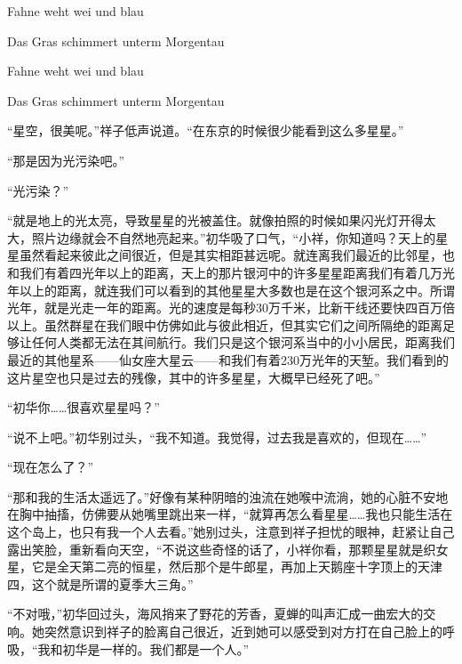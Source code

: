 \documentclass{article}
\begin{document}
Fahne weht wei und blau

Das Gras schimmert unterm Morgentau

Fahne weht wei und blau

Das Gras schimmert unterm Morgentau



“星空，很美呢。”祥子低声说道。“在东京的时候很少能看到这么多星星。”



“那是因为光污染吧。”



“光污染？”



“就是地上的光太亮，导致星星的光被盖住。就像拍照的时候如果闪光灯开得太大，照片边缘就会不自然地亮起来。”初华吸了口气，“小祥，你知道吗？天上的星星虽然看起来彼此之间很近，但是其实相距甚远呢。就连离我们最近的比邻星，也和我们有着四光年以上的距离，天上的那片银河中的许多星星距离我们有着几万光年以上的距离，就连我们可以看到的其他星星大多数也是在这个银河系之中。所谓光年，就是光走一年的距离。光的速度是每秒30万千米，比新干线还要快四百万倍以上。虽然群星在我们眼中仿佛如此与彼此相近，但其实它们之间所隔绝的距离足够让任何人类都无法在其间航行。我们只是这个银河系当中的小小居民，距离我们最近的其他星系——仙女座大星云——和我们有着230万光年的天堑。我们看到的这片星空也只是过去的残像，其中的许多星星，大概早已经死了吧。”



“初华你……很喜欢星星吗？”



“说不上吧。”初华别过头，“我不知道。我觉得，过去我是喜欢的，但现在……”



“现在怎么了？”



“那和我的生活太遥远了。”好像有某种阴暗的浊流在她喉中流淌，她的心脏不安地在胸中抽搐，仿佛要从她嘴里跳出来一样，“就算再怎么看星星……我也只能生活在这个岛上，也只有我一个人去看。”她别过头，注意到祥子担忧的眼神，赶紧让自己露出笑脸，重新看向天空，“不说这些奇怪的话了，小祥你看，那颗星星就是织女星，它是全天第二亮的恒星，然后那个是牛郎星，再加上天鹅座十字顶上的天津四，这个就是所谓的夏季大三角。”



“不对哦，”初华回过头，海风捎来了野花的芳香，夏蝉的叫声汇成一曲宏大的交响。她突然意识到祥子的脸离自己很近，近到她可以感受到对方打在自己脸上的呼吸，“我和初华是一样的。我们都是一个人。”
\end{document}
